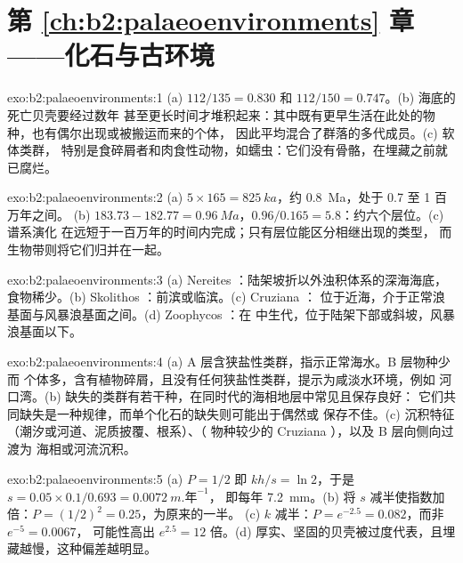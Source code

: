 \section*{第 \ref{ch:b2:palaeoenvironments} 章——化石与古环境}

\begin{solution}{exo:b2:palaeoenvironments:1}
(a) $112/135 = 0.830$ 和 $112/150 = 0.747$。(b) 海底的死亡贝壳要经过数年
甚至更长时间才堆积起来：其中既有更早生活在此处的物种，也有偶尔出现或被搬运而来的个体，
因此平均混合了群落的多代成员。(c) 软体类群，
特别是食碎屑者和肉食性动物，如蠕虫：它们没有骨骼，在埋藏之前就已腐烂。
\end{solution}

\begin{solution}{exo:b2:palaeoenvironments:2}
(a) $5 \times 165 = \qty{825}{ka}$，约 \qty{0.8}{Ma}，处于 0.7 至 1 百万年之间。
(b) $183.73 - 182.77 = \qty{0.96}{Ma}$，$0.96/0.165 = 5.8$：约六个层位。(c) 谱系演化
在远短于一百万年的时间内完成；只有层位能区分相继出现的类型，
而生物带则将它们归并在一起。
\end{solution}

\begin{solution}{exo:b2:palaeoenvironments:3}
(a) Nereites ：陆架坡折以外浊积体系的深海海底，
食物稀少。(b) Skolithos ：前滨或临滨。(c) Cruziana ：
位于近海，介于正常浪基面与风暴浪基面之间。(d) Zoophycos ：在
中生代，位于陆架下部或斜坡，风暴浪基面以下。
\end{solution}

\begin{solution}{exo:b2:palaeoenvironments:4}
(a) A 层含狭盐性类群，指示正常海水。B 层物种少而
个体多，含有植物碎屑，且没有任何狭盐性类群，提示为咸淡水环境，例如
河口湾。(b) 缺失的类群有若干种，在同时代的海相地层中常见且保存良好：
它们共同缺失是一种规律，而单个化石的缺失则可能出于偶然或
保存不佳。(c) 沉积特征（潮汐或河道、泥质披覆、根系）、（
物种较少的 Cruziana ），以及 B 层向侧向过渡为
海相或河流沉积。
\end{solution}

\begin{solution}{exo:b2:palaeoenvironments:5}
(a) $P = 1/2$ 即 $kh/s = \ln 2$，于是 $s = 0.05 \times 0.1/0.693 = \qty{0.0072}{m.\text{年}^{-1}}$，
即每年 \qty{7.2}{mm}。(b) 将 $s$ 减半使指数加倍：$P = (1/2)^2 = 0.25$，为原来的一半。
(c) $k$ 减半：$P = e^{-2.5} = 0.082$，而非 $e^{-5} = 0.0067$，
可能性高出 $e^{2.5} = 12$ 倍。(d) 厚实、坚固的贝壳被过度代表，且埋藏越慢，这种偏差越明显。
\end{solution}

